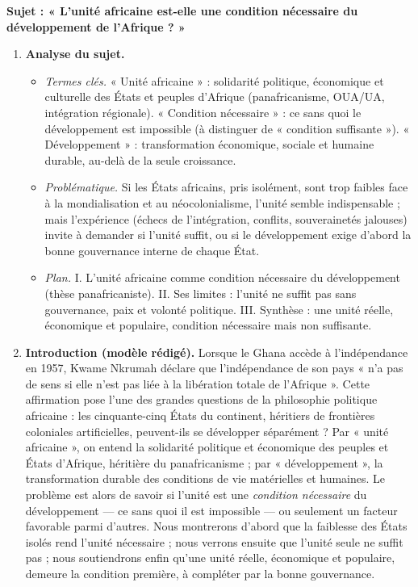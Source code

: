 \documentclass[11pt]{article}
\begin{document}
\begin{corrige}
\textbf{Sujet : « L'unité africaine est-elle une condition nécessaire du développement de l'Afrique ? »}

\begin{enumerate}
\item \textbf{Analyse du sujet.}
\begin{itemize}
\item \emph{Termes clés.} « Unité africaine » : solidarité politique, économique et culturelle des États et peuples d'Afrique (panafricanisme, OUA/UA, intégration régionale). « Condition nécessaire » : ce sans quoi le développement est impossible (à distinguer de « condition suffisante »). « Développement » : transformation économique, sociale et humaine durable, au-delà de la seule croissance.
\item \emph{Problématique.} Si les États africains, pris isolément, sont trop faibles face à la mondialisation et au néocolonialisme, l'unité semble indispensable ; mais l'expérience (échecs de l'intégration, conflits, souverainetés jalouses) invite à demander si l'unité suffit, ou si le développement exige d'abord la bonne gouvernance interne de chaque État.
\item \emph{Plan.} I. L'unité africaine comme condition nécessaire du développement (thèse panafricaniste). II. Ses limites : l'unité ne suffit pas sans gouvernance, paix et volonté politique. III. Synthèse : une unité réelle, économique et populaire, condition nécessaire mais non suffisante.
\end{itemize}
\item \textbf{Introduction (modèle rédigé).} Lorsque le Ghana accède à l'indépendance en 1957, Kwame Nkrumah déclare que l'indépendance de son pays « n'a pas de sens si elle n'est pas liée à la libération totale de l'Afrique ». Cette affirmation pose l'une des grandes questions de la philosophie politique africaine : les cinquante-cinq États du continent, héritiers de frontières coloniales artificielles, peuvent-ils se développer séparément ? Par « unité africaine », on entend la solidarité politique et économique des peuples et États d'Afrique, héritière du panafricanisme ; par « développement », la transformation durable des conditions de vie matérielles et humaines. Le problème est alors de savoir si l'unité est une \emph{condition nécessaire} du développement — ce sans quoi il est impossible — ou seulement un facteur favorable parmi d'autres. Nous montrerons d'abord que la faiblesse des États isolés rend l'unité nécessaire ; nous verrons ensuite que l'unité seule ne suffit pas ; nous soutiendrons enfin qu'une unité réelle, économique et populaire, demeure la condition première, à compléter par la bonne gouvernance.

\end{enumerate}
\end{corrige}
\end{document}
